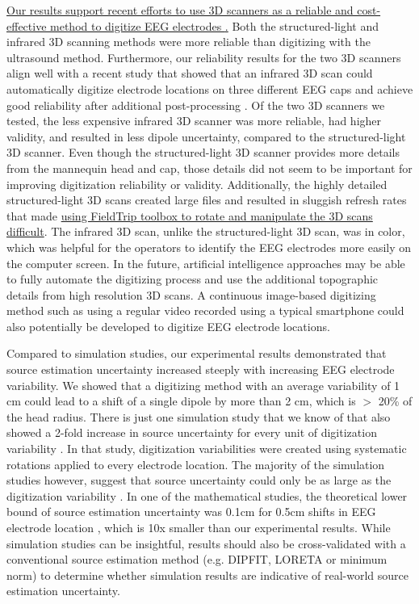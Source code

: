 \documentclass[../thesis_seyed.tex]{subfiles}
\begin{document}
\ul{Our results support recent efforts to use 3D scanners as a reliable and cost-effective method to digitize EEG electrodes \cite{Taberna2019-zv,Chen2019-sc, Homolle2019-pd}.} Both the structured-light and infrared 3D scanning methods were more reliable than digitizing with the ultrasound method. Furthermore, our reliability results for the two 3D scanners align well with a recent study that showed that an infrared 3D scan could automatically digitize electrode locations on three different EEG caps and achieve good reliability after additional post-processing \cite{Taberna2019-zv}. Of the two 3D scanners we tested, the less expensive infrared 3D scanner was more reliable, had higher validity, and resulted in less dipole uncertainty, compared to the structured-light 3D scanner. Even though the structured-light 3D scanner provides more details from the mannequin head and cap, those details did not seem to be important for improving digitization reliability or validity. Additionally, the highly detailed structured-light 3D scans created large files and resulted in sluggish refresh rates that made \ul{using FieldTrip toolbox to rotate and manipulate the 3D scans difficult}. The infrared 3D scan, unlike the structured-light 3D scan, was in color, which was helpful for the operators to identify the EEG electrodes more easily on the computer screen. In the future, artificial intelligence approaches may be able to fully automate the digitizing process and use the additional topographic details from high resolution 3D scans. A continuous image-based digitizing method such as using a regular video recorded using a typical smartphone could also potentially be developed to digitize EEG electrode locations. 

Compared to simulation studies, our experimental results demonstrated that source estimation uncertainty increased steeply with increasing EEG electrode variability. We showed that a digitizing method with an average variability of 1 cm could lead to a shift of a single dipole by more than 2 cm, which is $>$ 20\% of the head radius. There is just one simulation study that we know of that also showed a 2-fold increase in source uncertainty for every unit of digitization variability \cite{Akalin_Acar2013-rv}. In that study, digitization variabilities were created using systematic rotations applied to every electrode location. The majority of the simulation studies however, suggest that source uncertainty could only be as large as the digitization variability \cite{Khosla1999-bz,Van_Hoey2000-jt,Wang2001-fp,Beltrachini2011-je}. In one of the mathematical studies, the theoretical lower bound of source estimation uncertainty was 0.1cm for 0.5cm shifts in EEG electrode location \cite{Beltrachini2011-je}, which is 10x smaller than our experimental results. While simulation studies can be insightful, results should also be cross-validated with a conventional source estimation method (e.g. DIPFIT, LORETA or minimum norm) to determine whether simulation results are indicative of real-world source estimation uncertainty.
\end{document}
